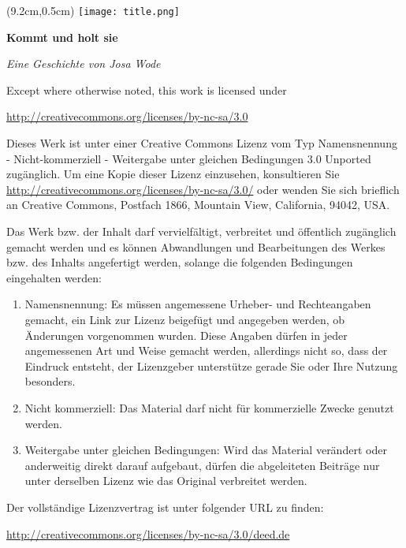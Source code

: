 \documentclass[paper=a5,fontsize=11pt,DIV=10]{scrreprt}
\begin{document}
\vspace*{3.6cm}

\begin{textblock*}{4.5cm}(9.2cm,0.5cm) %
\texttt{[image: title.png]}
\end{textblock*}
\noindent
{\Huge \textbf{\sffamily Kommt und holt sie}}

\noindent
{\textit{Eine Geschichte von Josa Wode}}

\vspace{1.1cm}
\noindent

\clearpage
{}

{\licensefont\small
\noindent
Except where otherwise noted, this work is licensed under

\noindent
\url{http://creativecommons.org/licenses/by-nc-sa/3.0}

\vspace{0.5cm}
\noindent

Dieses Werk ist unter einer Creative Commons Lizenz vom Typ Namensnennung -
Nicht-kommerziell - Weitergabe unter gleichen Bedingungen 3.0 Unported
zugänglich. Um eine Kopie dieser Lizenz einzusehen, konsultieren Sie
\url{http://creativecommons.org/licenses/by-nc-sa/3.0/} oder wenden Sie sich
brieflich an Creative Commons, Postfach 1866, Mountain View, California, 94042,
USA.

Das Werk bzw. der Inhalt darf vervielfältigt, verbreitet und öffentlich
zugänglich gemacht werden und es können Abwandlungen und Bearbeitungen des
Werkes bzw. des Inhalts angefertigt werden, solange die folgenden Bedingungen
eingehalten werden:

\begin{enumerate}
\item Namensnennung: Es müssen angemessene Urheber- und Rechteangaben gemacht, ein
   Link zur Lizenz beigefügt und angegeben werden, ob Änderungen vorgenommen
   wurden. Diese Angaben dürfen in jeder angemessenen Art und Weise gemacht
   werden, allerdings nicht so, dass der Eindruck entsteht, der Lizenzgeber
   unterstütze gerade Sie oder Ihre Nutzung besonders.

\item  Nicht kommerziell: Das Material darf nicht für kommerzielle Zwecke genutzt
   werden.

\item  Weitergabe unter gleichen Bedingungen: Wird das Material verändert oder
   anderweitig direkt darauf aufgebaut, dürfen die abgeleiteten Beiträge nur
   unter derselben Lizenz wie das Original verbreitet werden.
\end{enumerate}

\noindent
Der vollständige Lizenzvertrag ist unter folgender URL zu finden:

\noindent
\url{http://creativecommons.org/licenses/by-nc-sa/3.0/deed.de}
}
\end{document}
